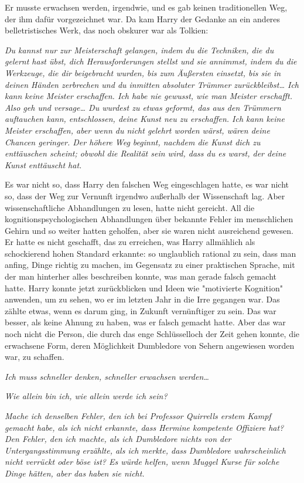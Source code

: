 {Er musste erwachsen werden, irgendwie, und es gab keinen traditionellen Weg, der ihm dafür vorgezeichnet war. Da kam Harry der Gedanke an ein anderes belletristisches Werk, das noch obskurer war als Tolkien:

\emph{Du kannst nur zur Meisterschaft gelangen, indem du die Techniken, die du gelernt hast übst, dich Herausforderungen stellst und sie annimmst, indem du die Werkzeuge, die dir beigebracht wurden, bis zum Äußersten einsetzt, bis sie in deinen Händen zerbrechen und du inmitten absoluter Trümmer zurückbleibst… Ich kann keine Meister erschaffen. Ich habe nie gewusst, wie man Meister erschafft. Also geh und versage… Du wurdest zu etwas geformt, das aus den Trümmern auftauchen kann, entschlossen, deine Kunst neu zu erschaffen. Ich kann keine Meister erschaffen, aber wenn du nicht gelehrt worden wärst, wären deine Chancen geringer. Der höhere Weg beginnt, nachdem die Kunst dich zu enttäuschen scheint; obwohl die Realität sein wird, dass du es warst, der deine Kunst enttäuscht hat.}

Es war nicht so, dass Harry den falschen Weg eingeschlagen hatte, es war nicht so, dass der Weg zur Vernunft irgendwo außerhalb der Wissenschaft lag. Aber wissenschaftliche Abhandlungen zu lesen, hatte nicht gereicht. All die kognitionspsychologischen Abhandlungen über bekannte Fehler im menschlichen Gehirn und so weiter hatten geholfen, aber sie waren nicht ausreichend gewesen. Er hatte es nicht geschafft, das zu erreichen, was Harry allmählich als schockierend hohen Standard erkannte: so unglaublich rational zu sein, dass man anfing, Dinge richtig zu machen, im Gegensatz zu einer praktischen Sprache, mit der man hinterher alles beschreiben konnte, was man gerade falsch gemacht hatte. Harry konnte jetzt zurückblicken und Ideen wie "motivierte Kognition" anwenden, um zu sehen, wo er im letzten Jahr in die Irre gegangen war. Das zählte etwas, wenn es darum ging, in Zukunft vernünftiger zu sein. Das war besser, als keine Ahnung zu haben, was er falsch gemacht hatte. Aber das war noch nicht die Person, die durch das enge Schlüsselloch der Zeit gehen konnte, die erwachsene Form, deren Möglichkeit Dumbledore von Sehern angewiesen worden war, zu schaffen.

\emph{\hfill\break Ich muss schneller denken, schneller erwachsen werden…}

\emph{Wie allein bin ich, wie allein werde ich sein?}

\emph{Mache ich denselben Fehler, den ich bei Professor Quirrells erstem Kampf gemacht habe, als ich nicht erkannte, dass Hermine kompetente Offiziere hat? Den Fehler, den ich machte, als ich Dumbledore nichts von der Untergangsstimmung erzählte, als ich merkte, dass Dumbledore wahrscheinlich nicht verrückt oder böse ist? Es würde helfen, wenn Muggel Kurse für solche Dinge hätten, aber das haben sie nicht.}

}
